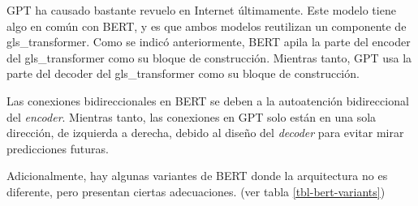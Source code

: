 GPT ha causado bastante revuelo en Internet últimamente. Este modelo tiene algo en común con BERT, y es que ambos modelos reutilizan un componente de \Gls{gls_transformer}. Como se indicó anteriormente, BERT apila la parte del encoder del \Gls{gls_transformer} como su bloque de construcción. Mientras tanto, GPT usa la parte del decoder del \Gls{gls_transformer} como su bloque de construcción.

Las conexiones bidireccionales en BERT se deben a la autoatención bidireccional del \textit{encoder}. Mientras tanto, las conexiones en GPT solo están en una sola dirección, de izquierda a derecha, debido al diseño del \textit{decoder} para evitar mirar predicciones futuras.

Adicionalmente, hay algunas variantes de BERT donde la arquitectura no es diferente, pero presentan ciertas adecuaciones. (ver tabla \ref{tbl-bert-variants}) 

